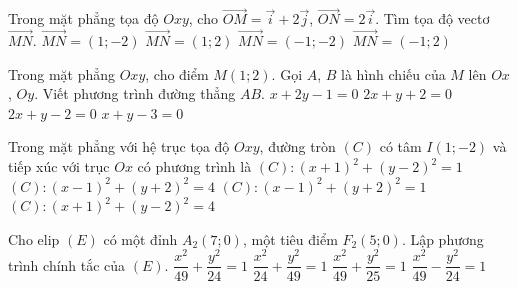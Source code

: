 \begin{ex}%
Trong mặt phẳng tọa độ $Oxy$, cho $\overrightarrow{OM}=\overrightarrow{i}+2\overrightarrow{j}$, $\overrightarrow{ON}=2\overrightarrow{i}$. Tìm tọa độ vectơ $\overrightarrow{MN}$.
\choice
{\True $\overrightarrow{MN}=(1;-2)$}
{$\overrightarrow{MN}=(1;2)$}
{$\overrightarrow{MN}=(-1;-2)$}
{$\overrightarrow{MN}=(-1;2)$}
\end{ex}

\begin{ex}%
Trong mặt phẳng $Oxy$, cho điểm $M\left(1;2\right)$. Gọi $A$, $B$ là hình chiếu của $M$ lên $Ox$, $Oy$. Viết phương trình đường thẳng $AB$.
\choice
{$x+2y-1=0$}
{$2x+y+2=0$}
{\True $2x+y-2=0$}
{$x+y-3=0$}
\end{ex}

\begin{ex}%
Trong mặt phẳng với hệ trục tọa độ $Oxy$, đường tròn $(C)$ có tâm $I(1;-2)$ và tiếp xúc với trục $Ox$ có phương trình là
\choice
{$(C): (x+1)^2+(y-2)^2=1$}
{\True $(C): (x-1)^2+(y+2)^2=4$}
{$(C): (x-1)^2+(y+2)^2=1$}
{$(C): (x+1)^2+(y-2)^2=4$}
\end{ex}

\begin{ex}%
Cho elip $(E)$ có một đỉnh $A_2(7;0)$, một tiêu điểm $F_2(5;0)$.  Lập phương trình chính tắc của $(E)$.
\choice
{\True $\dfrac{x^2}{49}+\dfrac{y^2}{24}=1$}
{$\dfrac{x^2}{24}+\dfrac{y^2}{49}=1$}
{$\dfrac{x^2}{49}+\dfrac{y^2}{25}=1$}
{$\dfrac{x^2}{49}-\dfrac{y^2}{24}=1$}
\end{ex}

